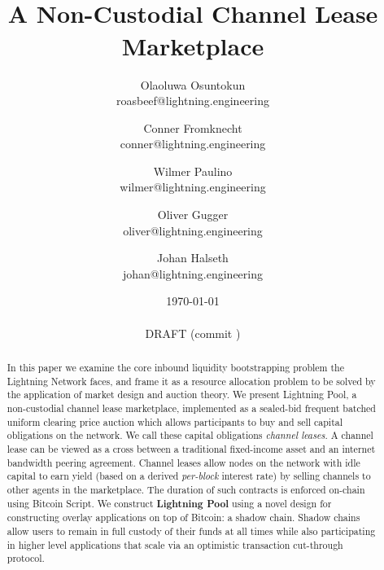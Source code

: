 \documentclass[10pt,a4paper]{article}
\theoremstyle{definition}
\begin{document}
\title{\texttt{} \\
    A Non-Custodial Channel Lease Marketplace}
\author{
    Olaoluwa Osuntokun \\
    \small{roasbeef@lightning.engineering}
    \and
    Conner Fromknecht \\
    \small{conner@lightning.engineering}
     \and
     Wilmer Paulino  \\
    \small{wilmer@lightning.engineering}
     \and
     Oliver Gugger \\
    \small{oliver@lightning.engineering}
     \and
     Johan Halseth \\
    \small{johan@lightning.engineering}
}

\date{\today \\~\\ DRAFT (commit \gitAbbrevHash)}
\maketitle

\begin{abstract}

In this paper we examine the core inbound liquidity bootstrapping problem the
Lightning Network faces, and frame it as a resource allocation problem to be
solved by the application of market design and auction theory. We present
Lightning Pool, a non-custodial channel lease marketplace, implemented as a
sealed-bid frequent batched uniform clearing price auction which allows
participants to buy and sell capital obligations on the network. We call these
capital obligations \emph{channel leases}. A channel lease can be viewed as a
cross between a traditional fixed-income asset and an internet bandwidth
peering agreement. Channel leases allow nodes on the network with idle capital
to earn yield (based on a derived \emph{per-block} interest rate) by selling
channels to other agents in the marketplace. The duration of such contracts is
enforced on-chain using Bitcoin Script. We construct \textbf{Lightning Pool}
using a novel design for constructing overlay applications on top of Bitcoin: a
shadow chain. Shadow chains allow users to remain in full custody of their
funds at all times while also participating in higher level applications that
scale via an optimistic transaction cut-through protocol.

\end{abstract}

\newpage

\tableofcontents
\end{document}

